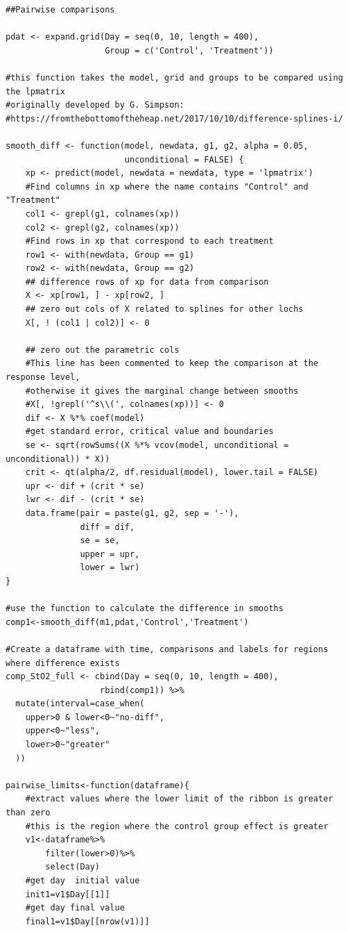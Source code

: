 \documentclass[Royal,times,sagev]{sagej}
\begin{document}
\begin{verbatim}
##Pairwise comparisons

pdat <- expand.grid(Day = seq(0, 10, length = 400),
                    Group = c('Control', 'Treatment'))

#this function takes the model, grid and groups to be compared using the lpmatrix
#originally developed by G. Simpson:
#https://fromthebottomoftheheap.net/2017/10/10/difference-splines-i/

smooth_diff <- function(model, newdata, g1, g2, alpha = 0.05,
                        unconditional = FALSE) {
    xp <- predict(model, newdata = newdata, type = 'lpmatrix')
    #Find columns in xp where the name contains "Control" and "Treatment"
    col1 <- grepl(g1, colnames(xp))
    col2 <- grepl(g2, colnames(xp))
    #Find rows in xp that correspond to each treatment
    row1 <- with(newdata, Group == g1)
    row2 <- with(newdata, Group == g2)
    ## difference rows of xp for data from comparison
    X <- xp[row1, ] - xp[row2, ]
    ## zero out cols of X related to splines for other lochs
    X[, ! (col1 | col2)] <- 0
    
    ## zero out the parametric cols
    #This line has been commented to keep the comparison at the response level,
    #otherwise it gives the marginal change between smooths
    #X[, !grepl('^s\\(', colnames(xp))] <- 0
    dif <- X %*% coef(model)
    #get standard error, critical value and boundaries
    se <- sqrt(rowSums((X %*% vcov(model, unconditional = unconditional)) * X))
    crit <- qt(alpha/2, df.residual(model), lower.tail = FALSE)
    upr <- dif + (crit * se)
    lwr <- dif - (crit * se)
    data.frame(pair = paste(g1, g2, sep = '-'),
               diff = dif,
               se = se,
               upper = upr,
               lower = lwr)
}

#use the function to calculate the difference in smooths
comp1<-smooth_diff(m1,pdat,'Control','Treatment')

#Create a dataframe with time, comparisons and labels for regions where difference exists
comp_StO2_full <- cbind(Day = seq(0, 10, length = 400),
                   rbind(comp1)) %>%
  mutate(interval=case_when(
    upper>0 & lower<0~"no-diff",
    upper<0~"less",
    lower>0~"greater"
  ))

pairwise_limits<-function(dataframe){
    #extract values where the lower limit of the ribbon is greater than zero
    #this is the region where the control group effect is greater
    v1<-dataframe%>%
        filter(lower>0)%>%
        select(Day)
    #get day  initial value
    init1=v1$Day[[1]]
    #get day final value
    final1=v1$Day[[nrow(v1)]]


\end{verbatim}
\end{document}
